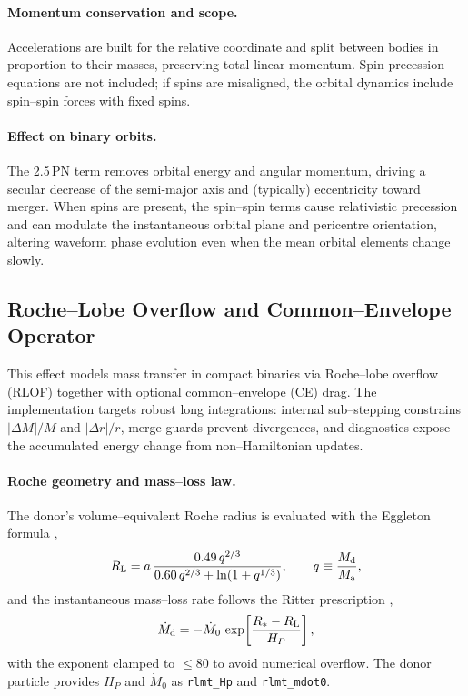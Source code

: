 \documentclass[11pt]{article}
\begin{document}
\paragraph{Momentum conservation and scope.}
Accelerations are built for the relative coordinate and split between bodies
in proportion to their masses, preserving total linear momentum.
Spin precession equations are not included; if spins are misaligned, the
orbital dynamics include spin--spin forces with fixed spins.

\paragraph{Effect on binary orbits.}
The 2.5\,PN term removes orbital energy and angular momentum, driving a secular
decrease of the semi-major axis and (typically) eccentricity toward merger.
When spins are present, the spin–spin terms cause relativistic
precession and can modulate the instantaneous orbital plane and pericentre
orientation, altering waveform phase evolution even when the mean orbital
elements change slowly.



\subsection{Roche–Lobe Overflow and Common–Envelope Operator}
\label{sec:RLOF}

This effect models mass transfer in compact binaries via Roche–lobe overflow
(RLOF) together with optional common–envelope (CE) drag. The implementation
targets robust long integrations: internal sub–stepping constrains
$|\Delta M|/M$ and $|\Delta r|/r$, merge guards prevent divergences, and
diagnostics expose the accumulated energy change from non–Hamiltonian updates.

\paragraph{Roche geometry and mass–loss law.}
The donor’s volume–equivalent Roche radius is evaluated with the Eggleton
formula \citep{Eggleton1983},
\begin{equation}
R_{\rm L} = a\,\frac{0.49\,q^{2/3}}{0.60\,q^{2/3} + \ln(1+q^{1/3})},
\qquad q \equiv \frac{M_{\rm d}}{M_{\rm a}},
\end{equation}
and the instantaneous mass–loss rate follows the Ritter prescription
\citep{Ritter1988},
\begin{equation}
\dot M_{\rm d} = -\dot M_0\,
\exp\!\left[\frac{R_\ast - R_{\rm L}}{H_P}\right],
\end{equation}
with the exponent clamped to $\le 80$ to avoid numerical overflow. The donor
particle provides $H_P$ and $\dot M_0$ as \texttt{rlmt\_Hp} and
\texttt{rlmt\_mdot0}.
\end{document}
